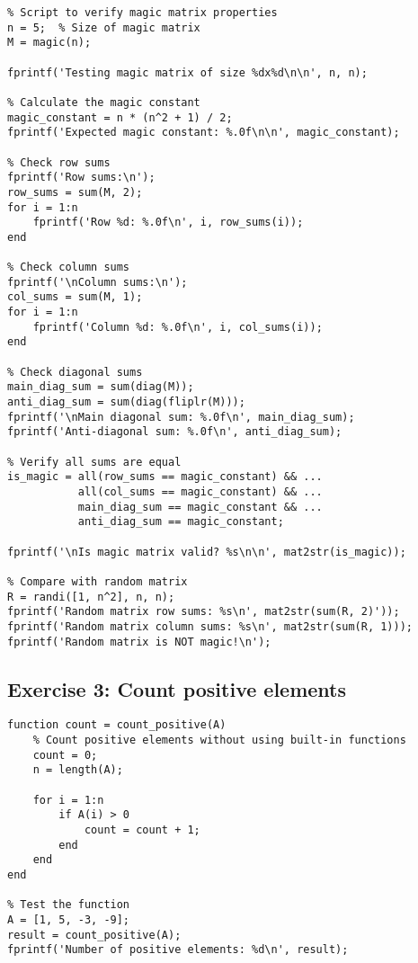 \documentclass[oneside]{article}
\begin{document}
\begin{verbatim}
% Script to verify magic matrix properties
n = 5;  % Size of magic matrix
M = magic(n);

fprintf('Testing magic matrix of size %dx%d\n\n', n, n);

% Calculate the magic constant
magic_constant = n * (n^2 + 1) / 2;
fprintf('Expected magic constant: %.0f\n\n', magic_constant);

% Check row sums
fprintf('Row sums:\n');
row_sums = sum(M, 2);
for i = 1:n
    fprintf('Row %d: %.0f\n', i, row_sums(i));
end

% Check column sums
fprintf('\nColumn sums:\n');
col_sums = sum(M, 1);
for i = 1:n
    fprintf('Column %d: %.0f\n', i, col_sums(i));
end

% Check diagonal sums
main_diag_sum = sum(diag(M));
anti_diag_sum = sum(diag(fliplr(M)));
fprintf('\nMain diagonal sum: %.0f\n', main_diag_sum);
fprintf('Anti-diagonal sum: %.0f\n', anti_diag_sum);

% Verify all sums are equal
is_magic = all(row_sums == magic_constant) && ...
           all(col_sums == magic_constant) && ...
           main_diag_sum == magic_constant && ...
           anti_diag_sum == magic_constant;

fprintf('\nIs magic matrix valid? %s\n\n', mat2str(is_magic));

% Compare with random matrix
R = randi([1, n^2], n, n);
fprintf('Random matrix row sums: %s\n', mat2str(sum(R, 2)'));
fprintf('Random matrix column sums: %s\n', mat2str(sum(R, 1)));
fprintf('Random matrix is NOT magic!\n');
\end{verbatim}

\subsection*{Exercise 3: Count positive elements}

\begin{verbatim}
function count = count_positive(A)
    % Count positive elements without using built-in functions
    count = 0;
    n = length(A);
    
    for i = 1:n
        if A(i) > 0
            count = count + 1;
        end
    end
end

% Test the function
A = [1, 5, -3, -9];
result = count_positive(A);
fprintf('Number of positive elements: %d\n', result);
\end{verbatim}
\end{document}
